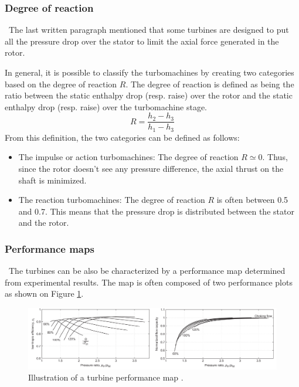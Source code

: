 \subsubsection{Degree of reaction}
\quad\ The last written paragraph mentioned that some turbines are designed to put all the pressure drop over the stator to limit the axial force generated in the rotor.

In general, it is possible to classify the turbomachines by creating two categories based on the degree of reaction \(R\). The degree of reaction is defined as being the ratio between the static enthalpy drop (resp. raise) over the rotor and the static enthalpy drop (resp. raise) over the turbomachine stage.
\begin{equation}
    R = \frac{h_2 - h_3}{h_1 - h_3}\label{eq:C4_R}
\end{equation}
From this definition, the two categories can be defined as follows:

\begin{itemize}
    \item The impulse or action turbomachines: The degree of reaction \(R\simeq 0\). Thus, since the rotor doesn't see any pressure difference, the axial thrust on the shaft is minimized. 
    \item The reaction turbomachines: The degree of reaction \(R\) is often between 0.5 and 0.7. This means that the pressure drop is distributed between the stator and the rotor.
\end{itemize}

\subsubsection{Performance maps}
\quad\ The turbines can be also be characterized by a performance map determined from experimental results. The map is often composed of two performance plots as shown on Figure \ref{fig:C4_turbmap}.

\begin{figure}[h]
    \centering
    \includegraphics[width=\textwidth]{Turb_Map.png}
    \caption{Illustration of a turbine performance map \cite{Dixon2013}.}
    \label{fig:C4_turbmap}
\end{figure}

